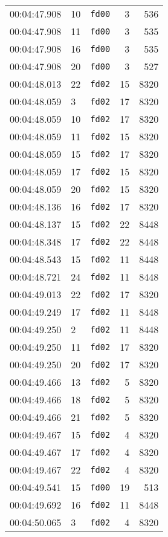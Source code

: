 \documentclass{article}
\begin{document}
\begin{longtable}{lllrr}
00:04:47.908 & 10 & \texttt{fd00} & 3 & 536 \\
00:04:47.908 & 11 & \texttt{fd00} & 3 & 535 \\
00:04:47.908 & 16 & \texttt{fd00} & 3 & 535 \\
00:04:47.908 & 20 & \texttt{fd00} & 3 & 527 \\
00:04:48.013 & 22 & \texttt{fd02} & 15 & 8320 \\
00:04:48.059 & 3 & \texttt{fd02} & 17 & 8320 \\
00:04:48.059 & 10 & \texttt{fd02} & 17 & 8320 \\
00:04:48.059 & 11 & \texttt{fd02} & 15 & 8320 \\
00:04:48.059 & 15 & \texttt{fd02} & 17 & 8320 \\
00:04:48.059 & 17 & \texttt{fd02} & 15 & 8320 \\
00:04:48.059 & 20 & \texttt{fd02} & 15 & 8320 \\
00:04:48.136 & 16 & \texttt{fd02} & 17 & 8320 \\
00:04:48.137 & 15 & \texttt{fd02} & 22 & 8448 \\
00:04:48.348 & 17 & \texttt{fd02} & 22 & 8448 \\
00:04:48.543 & 15 & \texttt{fd02} & 11 & 8448 \\
00:04:48.721 & 24 & \texttt{fd02} & 11 & 8448 \\
00:04:49.013 & 22 & \texttt{fd02} & 17 & 8320 \\
00:04:49.249 & 17 & \texttt{fd02} & 11 & 8448 \\
00:04:49.250 & 2 & \texttt{fd02} & 11 & 8448 \\
00:04:49.250 & 11 & \texttt{fd02} & 17 & 8320 \\
00:04:49.250 & 20 & \texttt{fd02} & 17 & 8320 \\
00:04:49.466 & 13 & \texttt{fd02} & 5 & 8320 \\
00:04:49.466 & 18 & \texttt{fd02} & 5 & 8320 \\
00:04:49.466 & 21 & \texttt{fd02} & 5 & 8320 \\
00:04:49.467 & 15 & \texttt{fd02} & 4 & 8320 \\
00:04:49.467 & 17 & \texttt{fd02} & 4 & 8320 \\
00:04:49.467 & 22 & \texttt{fd02} & 4 & 8320 \\
00:04:49.541 & 15 & \texttt{fd00} & 19 & 513 \\
00:04:49.692 & 16 & \texttt{fd02} & 11 & 8448 \\
00:04:50.065 & 3 & \texttt{fd02} & 4 & 8320 \\

\end{longtable}
\end{document}
